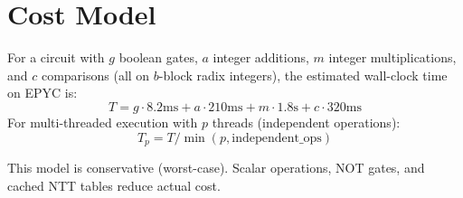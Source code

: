 \section{Cost Model}


\begin{definition}
For a circuit with $g$ boolean gates, $a$ integer additions, $m$ integer multiplications, and $c$ comparisons (all on $b$-block radix integers), the estimated wall-clock time on EPYC is:
$$T = g \cdot 8.2\text{ms} + a \cdot 210\text{ms} + m \cdot 1.8\text{s} + c \cdot 320\text{ms}$$
For multi-threaded execution with $p$ threads (independent operations):
$$T_p = T / \min(p, \text{independent\_ops})$$
\end{definition}

This model is conservative (worst-case). Scalar operations, NOT gates, and cached NTT tables reduce actual cost.

